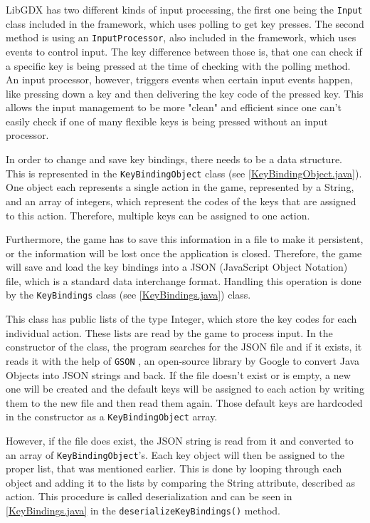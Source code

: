 \documentclass[12p]{article}
\begin{document}
LibGDX has two different kinds of input processing, the first one being the \texttt{Input} class included in the framework, which uses polling to get key presses. The second method is using an \texttt{InputProcessor}, also included in the framework, which uses events to control input. The key difference between those is, that one can check if a specific key is being pressed at the time of checking with the polling method. An input processor, however, triggers events when certain input events happen, like pressing down a key and then delivering the key code of the pressed key. This allows the input management to be more "clean" and efficient since one can't easily check if one of many flexible keys is being pressed without an input processor.

In order to change and save key bindings, there needs to be a data structure. This is represented in the \texttt{KeyBindingObject} class (see \ref{KeyBindingObject.java}). One object each represents a single action in the game, represented by a String, and an array of integers, which represent the codes of the keys that are assigned to this action. Therefore, multiple keys can be assigned to one action.

Furthermore, the game has to save this information in a file to make it persistent, or the information will be lost once the application is closed. Therefore, the game will save and load the key bindings into a JSON (JavaScript Object Notation) file, which is a standard data interchange format. Handling this operation is done by the \texttt{KeyBindings} class (see \ref{KeyBindings.java}) class. 

This class has public lists of the type Integer, which store the key codes for each individual action. These lists are read by the game to process input. In the constructor of the class, the program searches for the JSON file and if it exists, it reads it with the help of \texttt{GSON} \cite{GSON}, an open-source library by Google to convert Java Objects into JSON strings and back. If the file doesn't exist or is empty, a new one will be created and the default keys will be assigned to each action by writing them to the new file and then read them again. Those default keys are hardcoded in the constructor as a \texttt{KeyBindingObject} array.

However, if the file does exist, the JSON string is read from it and converted to an array of \texttt{KeyBindingObject}'s. Each key object will then be assigned to the proper list, that was mentioned earlier. This is done by looping through each object and adding it to the lists by comparing the String attribute, described as \texttt{}{action}. This procedure is called deserialization and can be seen in \ref{KeyBindings.java} in the \texttt{deserializeKeyBindings()} method.
\end{document}
